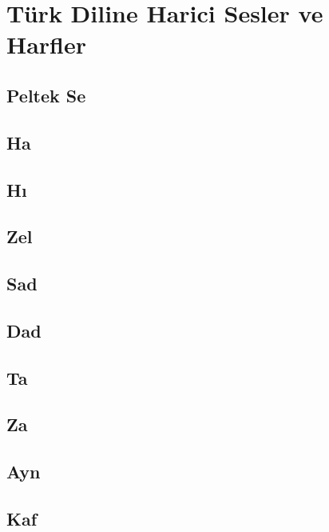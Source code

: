 \section{Türk Diline Harici Sesler ve Harfler}

\subsection*{Peltek Se}

\subsection*{Ha}

\subsection*{Hı}

\subsection*{Zel}

\subsection*{Sad}

\subsection*{Dad}

\subsection*{Ta}

\subsection*{Za}

\subsection*{Ayn}

\subsection*{Kaf}



